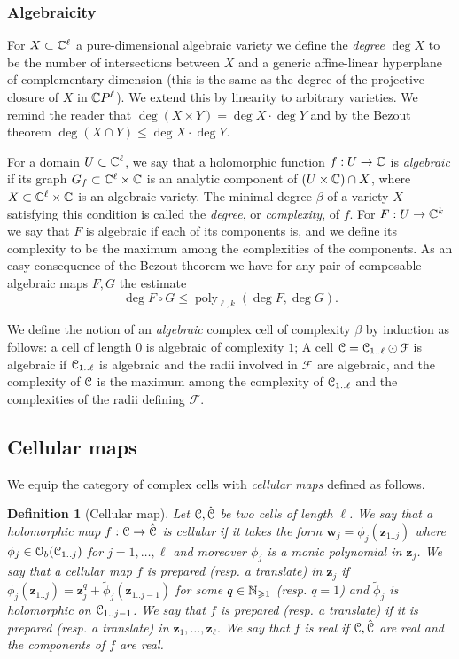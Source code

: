 \documentclass[reqno]{amsart}
\newtheorem{Def}[Cor]{Definition}{\bfseries}{\rmfamily}
\renewcommand\ge{\geqslant} \renewcommand\le{\leqslant}
\renewcommand\~[1]{\widetilde{#1}}
\def\poly{\operatorname{poly}} \def\J{\operatorname{J}}
\def\cF{{\mathcal F}} \def\cL{{\mathcal L}} \def\cR{{\mathcal R}}
\def\cO{{\mathcal O}}
\def\vz{{\mathbf z}}
\def\vw{{\mathbf w}}
\begin{document}
\subsubsection{Algebraicity}

For $X\subset{\mathbb C}^\ell$ a pure-dimensional algebraic variety we define
the \emph{degree} $\deg X$ to be the number of intersections between
$X$ and a generic affine-linear hyperplane of complementary dimension
(this is the same as the degree of the projective closure of $X$ in
${\mathbb C} P^\ell$). We extend this by linearity to arbitrary varieties. We
remind the reader that $\deg(X\times Y)=\deg X\cdot\deg Y$ and by the
Bezout theorem $\deg(X\cap Y)\le \deg X\cdot \deg Y$.

For a domain $U\subset{\mathbb C}^\ell$, we say that a holomorphic function
$f:U\to{\mathbb C}$ is \emph{algebraic} if its graph
$G_f\subset{\mathbb C}^\ell\times{\mathbb C}$ is an analytic component of
$(U\times{\mathbb C})\cap X$, where $X\subset{\mathbb C}^\ell\times{\mathbb C}$ is an algebraic
variety. The minimal degree $\beta$ of a variety $X$ satisfying this
condition is called the \emph{degree}, or \emph{complexity}, of
$f$. For $F:U\to{\mathbb C}^k$ we say that $F$ is algebraic if each of its
components is, and we define its complexity to be the maximum among
the complexities of the components. As an easy consequence of the
Bezout theorem we have for any pair of composable algebraic maps $F,G$
the estimate
\begin{equation}
  \deg F\circ G \le \poly_{\ell,k}(\deg F,\deg G) .
\end{equation}

We define the notion of an \emph{algebraic} complex cell of complexity
$\beta$ by induction as follows: a cell of length $0$ is algebraic of
complexity $1$; A cell $\cC=\cC_{1..\ell}\odot\cF$ is algebraic if
${\mathcal C}_{1..\ell}$ is algebraic and the radii involved in $\cF$ are
algebraic, and the complexity of ${\mathcal C}$ is the maximum among the
complexity of ${\mathcal C}_{1..\ell}$ and the complexities of the radii defining
$\cF$.


\subsection{Cellular maps}

We equip the category of complex cells with \emph{cellular maps}
defined as follows.

\begin{Def}[Cellular map]\label{def:cell-maps}
  Let ${\mathcal C},\hat{{\mathcal C}}$ be two cells of length $\ell$. We say that a
  holomorphic map $f:{\mathcal C}\to\hat{{\mathcal C}}$ is \emph{cellular} if it takes the
  form $\vw_{j}=\phi_j(\vz_{1..j})$ where $\phi_j\in\cO_b(\cC_{1..j})$
  for $j=1,\ldots,\ell$ and moreover $\phi_j$ is a monic polynomial in
  $\vz_j$. We say that a cellular map $f$ is \emph{prepared}
  (resp. \emph{a translate}) in $\vz_j$ if
  $\phi_j(\vz_{1..j})=\vz_j^q+\tilde\phi_j(\vz_{1..j-1})$ for some
  $q\in\N_{\ge1}$ (resp. $q=1$) and $\tilde\phi_j$ is holomorphic on
  ${\mathcal C}_{1..j-1}$. We say that $f$ is \emph{prepared} (resp. a
  translate) if it is prepared (resp. a translate) in
  $\vz_1,\ldots,\vz_\ell$. We say that $f$ is \emph{real} if
  ${\mathcal C},\hat{{\mathcal C}}$ are real and the components of $f$ are real.
\end{Def}
\end{document}
